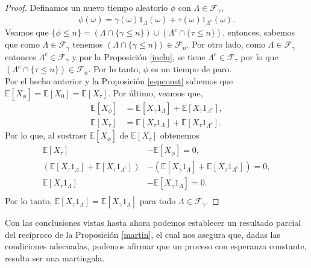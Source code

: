 \begin{proof}
\noindent Definamos un nuevo tiempo aleatorio $\phi$ con $\Lambda \in \mathcal{F}_{\gamma}$,
	\begin{align*}
		\phi(\omega) = \gamma(\omega)1_{\Lambda}(\omega) + \tau(\omega)1_{\Lambda^c}(\omega).
	\end{align*}
Veamos que $\{\phi \leq n\} = (\Lambda \cap \{\gamma \leq n\}) \cup (\Lambda^c \cap \{\tau \leq n\})$, entonces, sabemos que como $\Lambda \in \mathcal{F}_{\gamma}$ tenemos $(\Lambda \cap \{\gamma \leq n\}) \in \mathcal{F}_n$. Por otro lado, como $\Lambda \in \mathcal{F}_{\gamma}$ entonces $\Lambda^c \in \mathcal{F}_{\gamma}$ y por la Proposición \ref{inclu}, se tiene $\Lambda^c \in \mathcal{F}_{\tau}$ por lo que $(\Lambda^c \cap \{\tau \leq n\}) \in \mathcal{F}_n$. Por lo tanto, $\phi$ es un tiempo de paro.\\
	
Por el hecho anterior y la Proposición \ref{espconst} sabemos que $\mathbb{E}[X_{\phi}] =  \mathbb{E}[X_0] = \mathbb{E}[X_{\tau}]$. Por último, veamos que,
	\begin{align*}
		\mathbb{E}[X_{\phi}] & = \mathbb{E}[X_{\gamma}1_{\Lambda}] + \mathbb{E}[X_{\tau}1_{\Lambda^c}], \\
		\mathbb{E}[X_{\tau}] & = \mathbb{E}[X_{\tau}1_{\Lambda}] + \mathbb{E}[X_{\tau}1_{\Lambda^c}].
	\end{align*}
	Por lo que, al sustraer $\mathbb{E}[X_{\phi}]$ de $\mathbb{E}[X_{\tau}]$ obtenemos
	\begin{align*}
		\mathbb{E}[X_{\tau}] & - \mathbb{E}[X_{\phi}] = 0, \\
		(\mathbb{E}[X_{\tau}1_{\Lambda}] + \mathbb{E}[X_{\tau}1_{\Lambda^c}]) & - (\mathbb{E}[X_{\gamma}1_{\Lambda}] + \mathbb{E}[X_{\tau}1_{\Lambda^c}]) = 0, \\
		\mathbb{E}[X_{\tau}1_{\Lambda}] & - \mathbb{E}[X_{\gamma}1_{\Lambda}] = 0. \\
	\end{align*}
	Por lo tanto, $\mathbb{E}[X_{\tau}1_{\Lambda}] = \mathbb{E}[X_{\gamma}1_{\Lambda}]$ para todo $\Lambda \in \mathcal{F}_{\gamma}$.
\end{proof}

Con las conclusiones vistas hasta ahora podemos establecer un resultado parcial del recíproco de la Proposición \ref{martin}, el cual nos asegura que, dadas las condiciones adecuadas, podemos afirmar que un proceso con esperanza constante, resulta ser una martingala.


